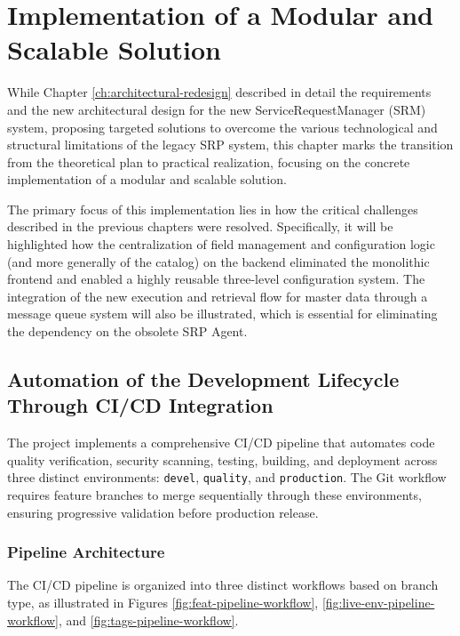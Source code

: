 \chapter{Implementation of a Modular and Scalable Solution}\label{sec:chapter-implementation}
\sloppy

While Chapter \ref{ch:architectural-redesign} described in detail the requirements and the new architectural design for the new ServiceRequestManager (SRM) system, proposing targeted solutions to overcome the various technological and structural limitations of the legacy SRP system, this chapter marks the transition from the theoretical plan to practical realization, focusing on the concrete implementation of a modular and scalable solution.

The primary focus of this implementation lies in how the critical challenges described in the previous chapters were resolved. Specifically, it will be highlighted how the centralization of field management and configuration logic (and more generally of the catalog) on the backend eliminated the monolithic frontend and enabled a highly reusable three-level configuration system. The integration of the new execution and retrieval flow for master data through a message queue system will also be illustrated, which is essential for eliminating the dependency on the obsolete SRP Agent.

\section{Automation of the Development Lifecycle Through CI/CD Integration}

The project implements a comprehensive CI/CD pipeline that automates code quality verification, security scanning, testing, building, and deployment across three distinct environments: \texttt{devel}, \texttt{quality}, and \texttt{production}. The Git workflow requires feature branches to merge sequentially through these environments, ensuring progressive validation before production release.

\subsection{Pipeline Architecture}\label{sec:ci_cd}

The CI/CD pipeline is organized into three distinct workflows based on branch type, as illustrated in Figures \ref{fig:feat-pipeline-workflow}, \ref{fig:live-env-pipeline-workflow}, and \ref{fig:tags-pipeline-workflow}.

